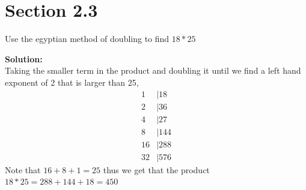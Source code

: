 \documentclass[12pt]{article}
\makeatletter
\theoremstyle{homework}
\newenvironment{exercise}[1]
{\def\@currentlabel{#1}\exercisecore}
{\endexercisecore}
\newcommand{\localhead}[1]{\par\smallskip\noindent\textbf{#1}\nobreak\\}%
\newcommand\solution{\localhead{Solution:}}
\makeatother
\begin{document}
\section*{Section 2.3}

\begin{exercise}{1} Use the egyptian method of doubling to find $18*25$
        \solution Taking the smaller term in the product and doubling it until we find a 
        left hand exponent of 2 that is larger than 25, 
        \begin{align*}
            1 &|18\\
            2 &|36\\
            4 &|27\\
            8 &|144\\
            16 &|288\\
            32 &|576
        \end{align*}
        Note that $16+8+1 = 25$ thus we get that the product $18*25 = 288+144+18 = 450$

    
\end{exercise}
\end{document}
